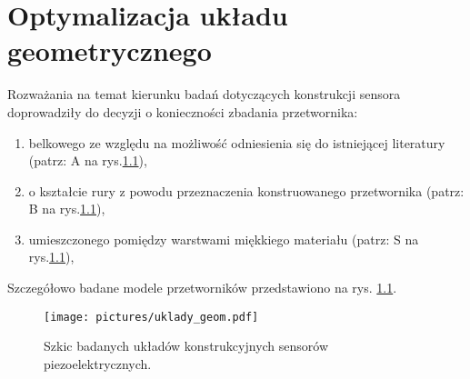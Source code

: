 \chapter{Optymalizacja układu geometrycznego}
\label{sec:construction_optymization}

\newcommand{\tabhead}[1]{\textbf{#1}}

Rozważania na temat kierunku badań dotyczących konstrukcji sensora 
doprowadziły do decyzji o konieczności zbadania przetwornika:
\begin{enumerate}
\item belkowego ze względu na możliwość odniesienia się do istniejącej literatury
\cite{belkowy_sensor}(patrz: A na rys.\ref{fig:construct_scetch}),
\item o kształcie rury z powodu przeznaczenia konstruowanego przetwornika (patrz: B na rys.\ref{fig:construct_scetch}),
\item umieszczonego pomiędzy warstwami miękkiego materiału (patrz: S na rys.\ref{fig:construct_scetch}),
\end{enumerate}
Szczegółowo badane modele przetworników przedstawiono na rys. \ref{fig:construct_scetch}. 

\begin{figure}[bthp]
\centering
\texttt{[image: pictures/uklady\_geom.pdf]}
\caption{Szkic badanych układów konstrukcyjnych sensorów piezoelektrycznych.}
\label{fig:construct_scetch}
\end{figure}


\begin{table}[htpb]
    \caption{Ranking optymalizacji konstrukcji pod względem napięcia 
    międzyszczytowego $V_{pp}$ dla czujnika 1.1}
    \label{fig:construction_11_rank_vpp}

    \centering
\end{table}

